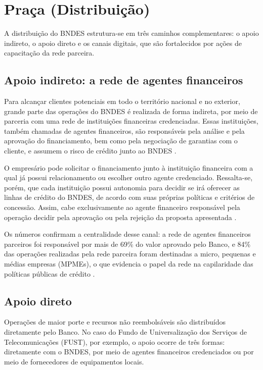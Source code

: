 \section{Praça (Distribuição)}

A distribuição do BNDES estrutura-se em três caminhos complementares: o apoio indireto, o apoio direto e os canais digitais, que são fortalecidos por ações de capacitação da rede parceira.

\subsection{Apoio indireto: a rede de agentes financeiros}

Para alcançar clientes potenciais em todo o território nacional e no exterior, grande parte das operações do BNDES é realizada de forma indireta, por meio de parceria com uma rede de instituições financeiras credenciadas. Essas instituições, também chamadas de agentes financeiros, são responsáveis pela análise e pela aprovação do financiamento, bem como pela negociação de garantias com o cliente, e assumem o risco de crédito junto ao BNDES \cite{bndes_instituicoes_credenciadas_2026}.

O empresário pode solicitar o financiamento junto à instituição financeira com a qual já possui relacionamento ou escolher outro agente credenciado. Ressalta-se, porém, que cada instituição possui autonomia para decidir se irá oferecer as linhas de crédito do BNDES, de acordo com suas próprias políticas e critérios de concessão. Assim, cabe exclusivamente ao agente financeiro responsável pela operação decidir pela aprovação ou pela rejeição da proposta apresentada \cite{bndes_rede_credenciada_2026}.

Os números confirmam a centralidade desse canal: a rede de agentes financeiros parceiros foi responsável por mais de 69\% do valor aprovado pelo Banco, e 84\% das operações realizadas pela rede parceira foram destinadas a micro, pequenas e médias empresas (MPMEs), o que evidencia o papel da rede na capilaridade das políticas públicas de crédito \cite{bndes_rede_credenciada_2026}.

\subsection{Apoio direto}

Operações de maior porte e recursos não reembolsáveis são distribuídos diretamente pelo Banco. No caso do Fundo de Universalização dos Serviços de Telecomunicações (FUST), por exemplo, o apoio ocorre de três formas: diretamente com o BNDES, por meio de agentes financeiros credenciados ou por meio de fornecedores de equipamentos locais.

